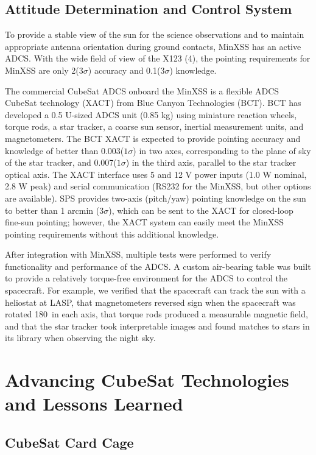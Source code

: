 \subsection{Attitude Determination and Control System}
To provide a stable view of the sun for the science observations and to maintain appropriate antenna orientation during ground contacts, MinXSS has an active ADCS. With the wide field of view of the X123 (4\degree), the pointing requirements for MinXSS are only 2\degree ($3\sigma$) accuracy and 0.1\degree ($3\sigma$) knowledge.

The commercial CubeSat ADCS onboard the MinXSS is a flexible ADCS CubeSat technology (XACT) from Blue Canyon Technologies (BCT). BCT has developed a 0.5 U-sized ADCS unit (0.85 kg) using miniature reaction wheels, torque rods, a star tracker, a coarse sun sensor, inertial measurement units, and magnetometers. The BCT XACT is expected to provide pointing accuracy and knowledge of better than 0.003\degree ($1\sigma$) in two axes, corresponding to the plane of sky of the star tracker, and 0.007\degree ($1\sigma$) in the third axis, parallel to the star tracker optical axis. The XACT interface uses 5 and 12 V power inputs (1.0 W nominal, 2.8 W peak) and serial communication (RS232 for the MinXSS, but other options are available). SPS provides two-axis (pitch/yaw) pointing knowledge on the sun to better than 1 arcmin ($3\sigma$), which can be sent to the XACT for closed-loop fine-sun pointing; however, the XACT system can easily meet the MinXSS pointing requirements without this additional knowledge.

After integration with MinXSS, multiple tests were performed to verify functionality and performance of the ADCS. A custom air-bearing table was built to provide a relatively torque-free environment for the ADCS to control the spacecraft. For example, we verified that the spacecraft can track the sun with a heliostat at LASP, that magnetometers reversed sign when the spacecraft was rotated 180\degree\ in each axis, that torque rods produced a measurable magnetic field, and that the star tracker took interpretable images and found matches to stars in its library when observing the night sky.

\section{Advancing CubeSat Technologies and Lessons Learned}
\subsection{CubeSat Card Cage}

